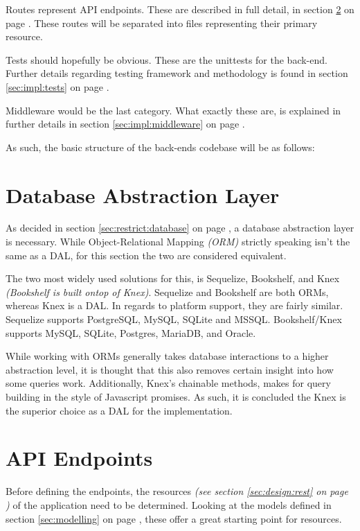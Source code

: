 		Routes represent API endpoints. These are described in full detail, in section \ref{sec:impl:api} on page \pageref{sec:impl:api}. These routes will be separated into files representing their primary resource.

		Tests should hopefully be obvious. These are the unittests for the back-end. Further details regarding testing framework and methodology is found in section \ref{sec:impl:tests} on page \pageref{sec:impl:tests}.

		Middleware would be the last category. What exactly these are, is explained in further details in section \ref{sec:impl:middleware} on page \pageref{sec:impl:middleware}.

		As such, the basic structure of the back-ends codebase will be as follows:

	\section{Database Abstraction Layer}
		As decided in section \ref{sec:restrict:database} on page \pageref{sec:restrict:database}, a database abstraction layer is necessary. While Object-Relational Mapping \emph{(ORM)} strictly speaking isn't the same as a DAL, for this section the two are considered equivalent.

		The two most widely used solutions for this, is Sequelize, Bookshelf, and Knex \emph{(Bookshelf is built ontop of Knex)}. Sequelize and Bookshelf are both ORMs, whereas Knex is a DAL. In regards to platform support, they are fairly similar. Sequelize supports PostgreSQL, MySQL, SQLite and MSSQL. Bookshelf/Knex supports MySQL, SQLite, Postgres, MariaDB, and Oracle.

		While working with ORMs generally takes database interactions to a higher abstraction level, it is thought that this also removes certain insight into how some queries work. Additionally, Knex's chainable methods, makes for query building in the style of Javascript promises. As such, it is concluded the Knex is the superior choice as a DAL for the implementation.

	\section{API Endpoints}
		\label{sec:impl:api}
		Before defining the endpoints, the resources \emph{(see section \ref{sec:design:rest} on page \pageref{sec:design:rest})} of the application need to be determined. Looking at the models defined in section \ref{sec:modelling} on page \pageref{sec:modelling}, these offer a great starting point for resources.

